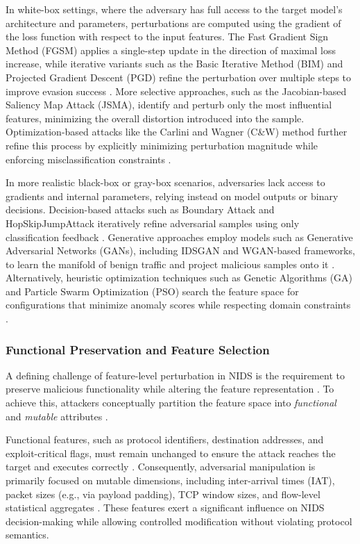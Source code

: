 In white-box settings, where the adversary has full access to the target model’s architecture and parameters, perturbations are computed using the gradient of the loss function with respect to the input features. 
The Fast Gradient Sign Method (FGSM) applies a single-step update in the direction of maximal loss increase, while iterative variants such as the Basic Iterative Method (BIM) and Projected Gradient Descent (PGD) refine the perturbation over multiple steps to improve evasion success \cite{sharma2024systematic}. 
More selective approaches, such as the Jacobian-based Saliency Map Attack (JSMA), identify and perturb only the most influential features, minimizing the overall distortion introduced into the sample. 
Optimization-based attacks like the Carlini and Wagner (C\&W) method further refine this process by explicitly minimizing perturbation magnitude while enforcing misclassification constraints \cite{ayub2020model}.  

In more realistic black-box or gray-box scenarios, adversaries lack access to gradients and internal parameters, relying instead on model outputs or binary decisions. 
Decision-based attacks such as Boundary Attack and HopSkipJumpAttack iteratively refine adversarial samples using only classification feedback \cite{zhang2022adversarial}. 
Generative approaches employ models such as Generative Adversarial Networks (GANs), including IDSGAN and WGAN-based frameworks, to learn the manifold of benign traffic and project malicious samples onto it \cite{wang2024progen}. 
Alternatively, heuristic optimization techniques such as Genetic Algorithms (GA) and Particle Swarm Optimization (PSO) search the feature space for configurations that minimize anomaly scores while respecting domain constraints \cite{jiang2022fgmd}.

\subsubsection{Functional Preservation and Feature Selection}

A defining challenge of feature-level perturbation in NIDS is the requirement to preserve malicious functionality while altering the feature representation \cite{merzouk2022investigating}. 
To achieve this, attackers conceptually partition the feature space into \emph{functional} and \emph{mutable} attributes \cite{wang2023evasion}.

Functional features, such as protocol identifiers, destination addresses, and exploit-critical flags, must remain unchanged to ensure the attack reaches the target and executes correctly \cite{jiang2022fgmd}. 
Consequently, adversarial manipulation is primarily focused on mutable dimensions, including inter-arrival times (IAT), packet sizes (e.g., via payload padding), TCP window sizes, and flow-level statistical aggregates \cite{han2021evaluating}. 
These features exert a significant influence on NIDS decision-making while allowing controlled modification without violating protocol semantics.

